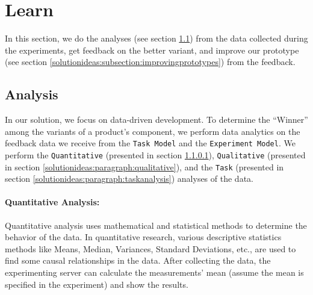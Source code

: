 \section{Learn}
In this section, we do the analyses (see section \ref{solutionideas:section:dataanalysis}) from the data collected during the experiments, get feedback on the better variant, and improve our prototype (see section \ref{solutionideas:subsection:improvingprototypes}) from the feedback.
\subsection{Analysis}
\label{solutionideas:section:dataanalysis}

In our solution, we focus on data-driven development. 
To determine the ``Winner'' among the variants of a product's component, we perform data analytics on the feedback data we receive from the \texttt{Task Model} and the \texttt{Experiment Model}.
We perform the \texttt{Quantitative} (presented in section \ref{solutionideas:paragraph:quantitative}), \texttt{Qualitative} (presented in section \ref{solutionideas:paragraph:qualitative}), and the \texttt{Task} (presented in section \ref{solutionideas:paragraph:taskanalysis}) analyses of the data.


\paragraph{Quantitative Analysis:}
\label{solutionideas:paragraph:quantitative}
Quantitative analysis uses mathematical and statistical methods to determine the behavior of the data.
In quantitative research, various descriptive statistics methods like Means, Median, Variances, Standard Deviations, etc., are used to find some causal relationships in the data.
After collecting the data, the experimenting server can calculate the measurements' mean (assume the mean is specified in the experiment) and show the results.


